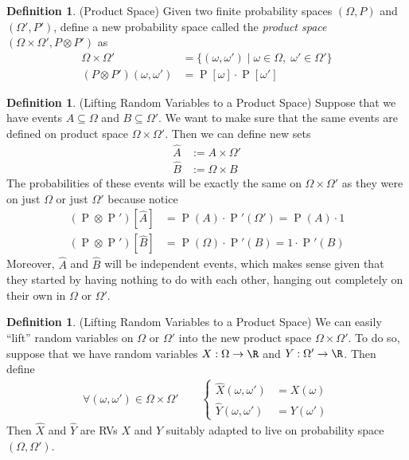 \documentclass[12pt]{article}
\theoremstyle{plain}
\theoremstyle{definition}
\newtheorem{defn}[thm]{Definition}
\theoremstyle{remark}
\newcommand{\ra}{\rightarrow}
\newcommand{\Prb}{\operatorname{P}}
\begin{document}
\begin{defn}{(Product Space)}
Given two finite probability spaces $(\Omega,P)$ and $(\Omega',P')$,
define a new probability space called the \emph{product space}
$(\Omega\times\Omega', P \otimes P')$ as
\begin{align*}
  \Omega\times\Omega'
  &= \{(\omega,\omega') \; |\; \omega\in\Omega, \; \omega'\in\Omega'\}
  \\
  (P \otimes P')(\omega, \omega')
  &= \Prb[\omega]\cdot \Prb[\omega']
\end{align*}
\end{defn}

\begin{defn}{(Lifting Random Variables to a Product Space)}
Suppose that we have events $A\subseteq \Omega$ and
$B\subseteq \Omega'$. We want to make sure that the same events are
defined on product space $\Omega\times \Omega'$. Then we can define new
sets
\begin{align*}
  \hat{A} &:= A\times \Omega' \\
  \hat{B} &:= \Omega \times B
\end{align*}
The probabilities of these events will be exactly the same on $\Omega
\times \Omega'$ as they were on just $\Omega$ or just $\Omega'$ because
notice
\begin{align*}
  (\Prb\otimes \Prb')[\hat{A}] &= \Prb(A) \cdot \Prb'(\Omega') = \Prb(A) \cdot 1\\
  (\Prb\otimes \Prb')[\hat{B}] &= \Prb(\Omega) \cdot \Prb'(B) = 1\cdot \Prb'(B)
\end{align*}
Moreover, $\hat{A}$ and $\hat{B}$ will be independent events, which
makes sense given that they started by having nothing to do with each
other, hanging out completely on their own in $\Omega$ or $\Omega'$.
\end{defn}

\begin{defn}{(Lifting Random Variables to a Product Space)}
We can easily ``lift'' random variables on $\Omega$ or $\Omega'$ into
the new product space $\Omega\times \Omega'$. To do so, suppose that we
have random variables $X:\Omega\ra\R$ and $Y:\Omega'\ra\R$. Then define
\begin{align*}
  \forall (\omega,\omega') \in \Omega\times \Omega' \qquad
  \begin{cases}
  \hat{X}(\omega, \omega') &= X(\omega) \\
  \hat{Y}(\omega, \omega') &= Y(\omega')
  \end{cases}
\end{align*}
Then $\hat{X}$ and $\hat{Y}$ are RVs $X$ and $Y$ suitably adapted to
live on probability space $(\Omega,\Omega')$.
\end{defn}
\end{document}
